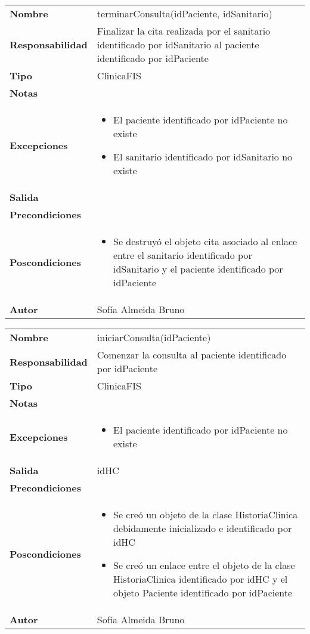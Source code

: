 \documentclass[11pt,a4paper]{article}
\begin{document}
\begin{table}[H]
\centering
\label{my-label}
\begin{tabularx}{\textwidth}{l|X}
\textbf{Nombre}          & terminarConsulta(idPaciente, idSanitario) \\
\textbf{Responsabilidad} & Finalizar la cita realizada por el sanitario identificado por idSanitario al paciente identificado por idPaciente\\
\textbf{Tipo}            & ClinicaFIS \\
\textbf{Notas}           &  \\
\textbf{Excepciones}     & 
\begin{itemize}
\item El paciente identificado por idPaciente no existe
\item El sanitario identificado por idSanitario no existe
\end{itemize}\\
\textbf{Salida}          &  \\
\textbf{Precondiciones}  &  \\
\textbf{Poscondiciones}  & \begin{itemize}
	\item Se destruyó el objeto cita asociado al enlace entre el sanitario identificado por idSanitario y el paciente identificado por idPaciente
\end{itemize}\\
\textbf{Autor}           & Sofía Almeida Bruno
\end{tabularx}
\end{table}

\begin{table}[H]
\centering
\label{my-label}
\begin{tabularx}{\textwidth}{l|X}
\textbf{Nombre}          & iniciarConsulta(idPaciente) \\
\textbf{Responsabilidad} & Comenzar la consulta al paciente identificado por idPaciente\\
\textbf{Tipo}            & ClinicaFIS \\
\textbf{Notas}           &  \\
\textbf{Excepciones}     & 
\begin{itemize}
\item El paciente identificado por idPaciente no existe
\end{itemize}\\
\textbf{Salida}          &  idHC\\
\textbf{Precondiciones}  &  \\
\textbf{Poscondiciones}  &
\begin{itemize}
\item Se creó un objeto de la clase HistoriaClinica debidamente inicializado e identificado por idHC
\item Se creó un enlace entre el objeto de la clase HistoriaClinica identificado por idHC y el objeto Paciente identificado por idPaciente
\end{itemize}\\
\textbf{Autor}           & Sofía Almeida Bruno
\end{tabularx}
\end{table}
\end{document}
